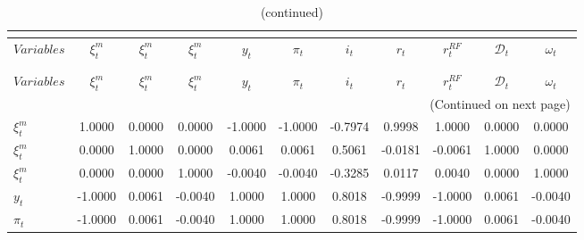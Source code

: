  
\begin{center}
\begin{longtable}{lcccccccccc} 
\caption{MATRIX OF CORRELATIONS}\\
 \label{Table:th_corr_matrix}\\
\toprule 
$Variables      $	 & 	 $         \xi^m_t$	 & 	 $         \xi^m_t$	 & 	 $         \xi^m_t$	 & 	 $              y_t$	 & 	 $           \pi_t$	 & 	 $              i_t$	 & 	 $              r_t$	 & 	 $         r^{RF}_t$	 & 	 $   \mathcal{D}_t$	 & 	 $        \omega_t$\\
\midrule \endfirsthead 
\caption{(continued)}\\
 \toprule \\ 
$Variables      $	 & 	 $         \xi^m_t$	 & 	 $         \xi^m_t$	 & 	 $         \xi^m_t$	 & 	 $              y_t$	 & 	 $           \pi_t$	 & 	 $              i_t$	 & 	 $              r_t$	 & 	 $         r^{RF}_t$	 & 	 $   \mathcal{D}_t$	 & 	 $        \omega_t$\\
\midrule \endhead 
\midrule \multicolumn{11}{r}{(Continued on next page)} \\ \bottomrule \endfoot 
\bottomrule \endlastfoot 
$\xi^m_t        $	 & 	           1.0000	 & 	           0.0000	 & 	           0.0000	 & 	          -1.0000	 & 	          -1.0000	 & 	          -0.7974	 & 	           0.9998	 & 	           1.0000	 & 	           0.0000	 & 	           0.0000 \\ 
$\xi^m_t        $	 & 	           0.0000	 & 	           1.0000	 & 	           0.0000	 & 	           0.0061	 & 	           0.0061	 & 	           0.5061	 & 	          -0.0181	 & 	          -0.0061	 & 	           1.0000	 & 	           0.0000 \\ 
$\xi^m_t        $	 & 	           0.0000	 & 	           0.0000	 & 	           1.0000	 & 	          -0.0040	 & 	          -0.0040	 & 	          -0.3285	 & 	           0.0117	 & 	           0.0040	 & 	           0.0000	 & 	           1.0000 \\ 
$y_t            $	 & 	          -1.0000	 & 	           0.0061	 & 	          -0.0040	 & 	           1.0000	 & 	           1.0000	 & 	           0.8018	 & 	          -0.9999	 & 	          -1.0000	 & 	           0.0061	 & 	          -0.0040 \\ 
$\pi_t          $	 & 	          -1.0000	 & 	           0.0061	 & 	          -0.0040	 & 	           1.0000	 & 	           1.0000	 & 	           0.8018	 & 	          -0.9999	 & 	          -1.0000	 & 	           0.0061	 & 	          -0.0040 \\ 

\end{longtable}
\end{center}
